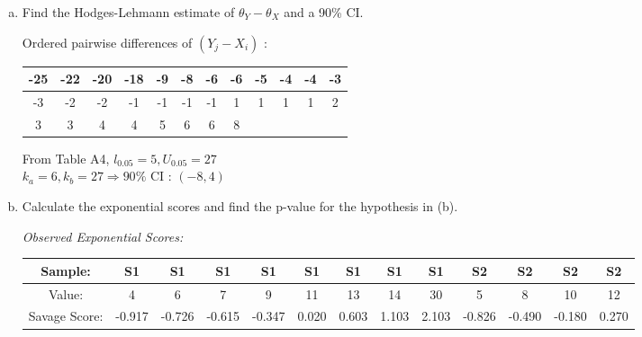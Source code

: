 \documentclass[12pt]{article}
\begin{document}
\begin{enumerate}[(a)]
\item Find the Hodges-Lehmann estimate of $\theta_Y-\theta_X$ and a 90\% CI.

Ordered pairwise differences of $(Y_j-X_i)$ : 
\begin{table}[H] \center
\begin{tabular}{|c|c|c|c|c|c|c|c|c|c|c|c|} \hline
-25 &-22& -20 &-18  &-9&  -8 & -6  &-6 & -5 & -4  &-4 & -3 \\ \hline
 -3 & -2 & -2& -1 & -1  &-1 & -1  & 1  & 1  & 1  & 1 &  2 \\ \hline
 3 & 3 &  4  & 4  & 5  & 6&6&8&&&&\\ \hline
\end{tabular}
\end{table}
From Table A4, $l_{0.05}=5, U_{0.05}=27$\\
$k_a=6, k_b=27 \Rightarrow 90\%$ CI : $(-8,4)$

\item Calculate the exponential scores and find the p-value for the hypothesis in (b).

\emph{Observed Exponential Scores: }
\begin{table}[H] \center \footnotesize
\begin{tabular}{|c|c|c|c|c|c|c|c|c|c|c|c|c|} \hline
Sample:			& S1 & S1 & S1 & S1 & S1 & S1 & S1 & S1 & S2 & S2 & S2 & S2 \\ \hline 
Value:			& 4 &  6 &  7 &  9 & 11 & 13 & 14 & 30 &  5 &  8 & 10 & 12 \\ \hline
Savage Score:	& -0.917 & -0.726 & -0.615 & -0.347 &  0.020 &  0.603 &  1.103 &  2.103 & -0.826 & -0.490 & -0.180 &  0.270 \\ \hline
\end{tabular}
\end{table}



\end{enumerate}
\end{document}
